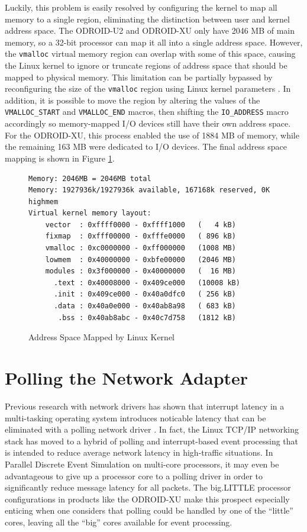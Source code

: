 \documentclass[11pt]{book}
\begin{document}
Luckily, this problem is easily resolved by configuring the kernel to map all memory to a
single region, eliminating the distinction between user and kernel address space.  The
ODROID-U2 and ODROID-XU only have 2046 MB of main memory, so a 32-bit processor can map it
all into a single address space.  However, the \verb;vmalloc; virtual memory region can
overlap with some of this space, causing the Linux kernel to ignore or truncate regions of
address space that should be mapped to physical memory.  This limitation can be partially
bypassed by reconfiguring the size of the \verb;vmalloc; region using Linux kernel
parameters \cite{vmalloc-overlap}.  In addition, it is possible to move the region by
altering the values of the \verb;VMALLOC_START; and \verb;VMALLOC_END; macros, then
shifting the \verb;IO_ADDRESS; macro accordingly so memory-mapped I/O devices still have
their own address space.  For the ODROID-XU, this process enabled the use of 1884 MB of
memory, while the remaining 163 MB were dedicated to I/O devices.  The final address space
mapping is shown in Figure \ref{addrmap}.

\begin{figure}
\begin{center}
\begin{verbatim}
Memory: 2046MB = 2046MB total
Memory: 1927936k/1927936k available, 167168k reserved, 0K highmem
Virtual kernel memory layout:
    vector  : 0xffff0000 - 0xffff1000   (   4 kB)
    fixmap  : 0xfff00000 - 0xfffe0000   ( 896 kB)
    vmalloc : 0xc0000000 - 0xff000000   (1008 MB)
    lowmem  : 0x40000000 - 0xbfe00000   (2046 MB)
    modules : 0x3f000000 - 0x40000000   (  16 MB)
      .text : 0x40008000 - 0x409ce000   (10008 kB)
      .init : 0x409ce000 - 0x40a0dfc0   ( 256 kB)
      .data : 0x40a0e000 - 0x40ab8a98   ( 683 kB)
       .bss : 0x40ab8abc - 0x40c7d758   (1812 kB)
\end{verbatim}
\end{center}
\caption{Address Space Mapped by Linux Kernel}
\label{addrmap}
\end{figure}

\section{Polling the Network Adapter}

Previous research with network drivers has shown that interrupt latency in a multi-tasking
operating system introduces noticable latency that can be eliminated with a polling
network driver \cite{dovrolis-01,liu-09}.  In fact, the Linux TCP/IP networking stack has
moved to a hybrid of polling and interrupt-based event processing that is intended to
reduce average network latency in high-traffic situations.  In Parallel Discrete Event
Simulation on multi-core processors, it may even be advantageous to give up a processor
core to a polling driver in order to significantly reduce message latency for all packets.
The big.LITTLE processor configurations in products like the ODROID-XU make this prospect
especially enticing when one considers that polling could be handled by one of the
``little'' cores, leaving all the ``big'' cores available for event processing.
\end{document}
